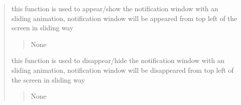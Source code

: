 \documentclass[letterpaper,10pt,english]{sphinxmanual}
\begin{document}
\begin{quote}
\begin{savenotes}
\begin{fulllineitems}

\begin{savenotes}\begin{fulllineitems}
\label{\detokenize{setting/notif_UI:oxin.notif_UI.UI_main_window.update_current_position}}
\pysigstartsignatures
{}
\pysigstopsignatures
\end{fulllineitems}\end{savenotes}


\begin{savenotes}\begin{fulllineitems}
\label{\detokenize{setting/notif_UI:oxin.notif_UI.UI_main_window.win_appear}}
\pysigstartsignatures
{}
\pysigstopsignatures
\sphinxAtStartPar
this function is used to appear/show the notification window with an sliding animation,
notification window will be appeared from top left of the screen in sliding way
\begin{quote}\begin{description}
\sphinxAtStartPar
None

\end{description}\end{quote}

\end{fulllineitems}\end{savenotes}


\begin{savenotes}\begin{fulllineitems}
\label{\detokenize{setting/notif_UI:oxin.notif_UI.UI_main_window.win_disappear}}
\pysigstartsignatures
{}
\pysigstopsignatures
\sphinxAtStartPar
this function is used to disappear/hide the notification window with an sliding animation,
notification window will be disappeared from top left of the screen in sliding way
\begin{quote}\begin{description}
\sphinxAtStartPar
None


\end{description}
\end{quote}
\end{fulllineitems}
\end{savenotes}
\end{fulllineitems}
\end{savenotes}
\end{quote}
\end{document}

